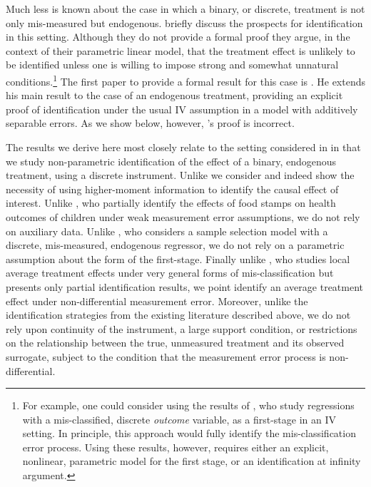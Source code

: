 Much less is known about the case in which a binary, or discrete, treatment is not only mis-measured but endogenous.
\cite{FL} briefly discuss the prospects for identification in this setting.
Although they do not provide a formal proof they argue, in the context of their parametric linear model, that the treatment effect is unlikely to be identified unless one is willing to impose strong and somewhat unnatural conditions.\footnote{For example, one could consider using the results of \cite{Hausman}, who study regressions with a mis-classified, discrete \emph{outcome} variable, as a first-stage in an IV setting. In principle, this approach would fully identify the mis-classification error process. Using these results, however, requires either an explicit, nonlinear, parametric model for the first stage, or an identification at infinity argument.} 
The first paper to provide a formal result for this case is \cite{Mahajan}.
He extends his main result to the case of an endogenous treatment, providing an explicit proof of identification under the usual IV assumption in a model with additively separable errors.
As we show below, however, \citeauthor{Mahajan}'s proof is incorrect.

The results we derive here most closely relate to the setting considered in \cite{Mahajan} in that we study non-parametric identification of the effect of a binary, endogenous treatment, using a discrete instrument.
Unlike \cite{Mahajan} we consider and indeed show the necessity of using higher-moment information to identify the causal effect of interest.
Unlike \cite{kreider2012}, who partially identify the effects of food stamps on health outcomes of children under weak measurement error assumptions, we do not rely on auxiliary data. 
Unlike \cite{shiu2015}, who considers a sample selection model with a discrete, mis-measured, endogenous regressor, we do not rely on a parametric assumption about the form of the first-stage.
Finally unlike \cite{Ura}, who studies local average treatment effects under very general forms of mis-classification but presents only partial identification results, we point identify an average treatment effect under non-differential measurement error.
Moreover, unlike the identification strategies from the existing literature described above, we do not rely upon continuity of the instrument, a large support condition, or restrictions on the relationship between the true, unmeasured treatment and its observed surrogate, subject to the condition that the measurement error process is non-differential.


